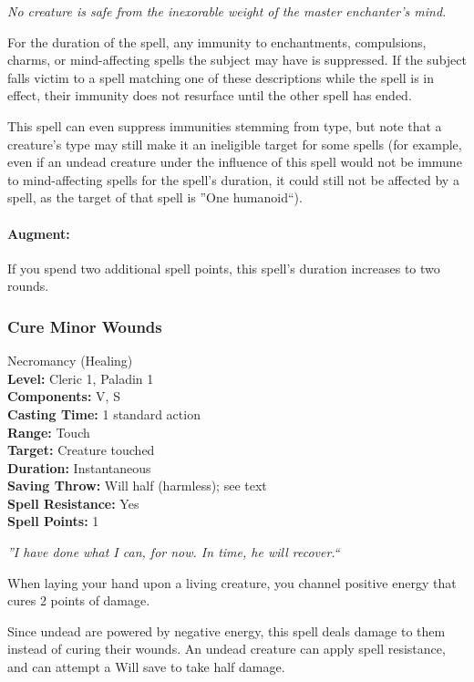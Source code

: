 \emph{No creature is safe from the inexorable weight of the master enchanter's mind.}

For the duration of the spell, any immunity to enchantments, compulsions, charms, or mind-affecting spells the subject may have is suppressed.
If the subject falls victim to a spell matching one of these descriptions while the spell is in effect, their immunity does not resurface until the
other spell has ended.

This spell can even suppress immunities stemming from type, but note that a creature's type may still make it an ineligible target for some spells
(for example, even if an undead creature under the influence of this spell would not be immune to mind-affecting spells for the spell's duration,
it could still not be affected by a  spell, as the target of that spell is ''One humanoid``).

\paragraph{Augment:} If you spend two additional spell points, this spell's duration increases to two rounds.
\subsubsection{Cure Minor Wounds}
\label{Spell:TouchOfVitality}
Necromancy (Healing)
\\ \textbf{Level:} Cleric 1, Paladin 1
\\ \textbf{Components:} V, S
\\ \textbf{Casting Time:} 1 standard action
\\ \textbf{Range:} Touch
\\ \textbf{Target:} Creature touched
\\ \textbf{Duration:} Instantaneous
\\ \textbf{Saving Throw:} Will half (harmless); see text
\\ \textbf{Spell Resistance:} Yes
\\ \textbf{Spell Points:} 1

\emph{''I have done what I can, for now. In time, he will recover.``}

When laying your hand upon a living creature, you channel positive energy that cures 2 points of damage.

Since undead are powered by negative energy, this spell deals damage to them instead of curing their wounds. 
An undead creature can apply spell resistance, and can attempt a Will save to take half damage.

